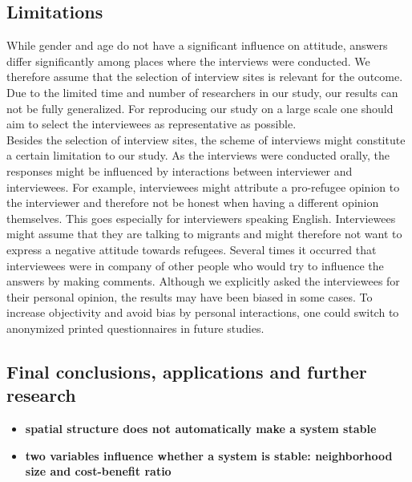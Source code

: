 \subsection{Limitations}
While gender and age do not have a significant influence on attitude, answers differ significantly among places where the interviews were conducted. We therefore assume that the selection of interview sites is relevant for the outcome. Due to the limited time and number of researchers in our study, our results can not be fully generalized. For reproducing our study on a large scale one should aim to select the interviewees as representative as possible.\\
Besides the selection of interview sites, the scheme of interviews might constitute a certain limitation to our study. As the interviews were conducted orally, the responses might be influenced by interactions between interviewer and interviewees. For example, interviewees might attribute a pro-refugee opinion to the interviewer and therefore not be honest when having a different opinion themselves. This goes especially for interviewers speaking English. Interviewees might assume that they are talking to migrants and might therefore not want to express a negative attitude towards refugees. Several times it occurred that interviewees were in company of other people who would try to influence the answers by making comments. Although we explicitly asked the interviewees for their personal opinion, the results may have been biased in some cases. To increase objectivity and avoid bias by personal interactions, one could switch to anonymized printed questionnaires in future studies.\\

\subsection{Final conclusions, applications and further research}

\begin{itemize}
	\item{\textbf{spatial structure does not automatically make a system stable}}\\
	\item{\textbf{two variables influence whether a system is stable: neighborhood size and cost-benefit ratio}}
\end{itemize}


